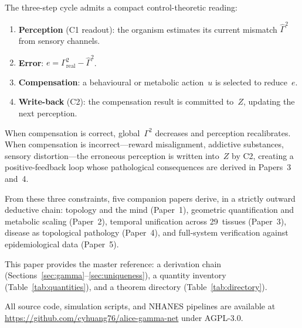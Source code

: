 \documentclass[aps,pre,twocolumn,superscriptaddress,floatfix]{revtex4-2}
\begin{document}
\begin{remark}
\label{rem:pec-loop}
The three-step cycle admits a compact control-theoretic
reading:
\begin{enumerate}
  \item \textbf{Perception} (C1 readout):
    the organism estimates its current mismatch
    $\hat\Gamma^2$ from sensory channels.
  \item \textbf{Error}:
    $e = \Gamma^2_{\text{real}}
    - \hat\Gamma^2$.
  \item \textbf{Compensation}:
    a behavioural or metabolic action~$u$ is selected
    to reduce~$e$.
  \item \textbf{Write-back} (C2):
    the compensation result is committed to~$Z$,
    updating the next perception.
\end{enumerate}
When compensation is correct, global~$\Gamma^2$
decreases and perception recalibrates.
When compensation is incorrect---reward misalignment,
addictive substances, sensory distortion---the
erroneous perception is written into~$Z$ by C2,
creating a positive-feedback loop whose
pathological consequences are derived in
Papers~3 and~4.
\end{remark}

From these three constraints, five companion papers
derive, in a strictly outward deductive chain:
topology and the mind (Paper~1),
geometric quantification and metabolic scaling (Paper~2),
temporal unification across 29~tissues (Paper~3),
disease as topological pathology (Paper~4),
and full-system verification against epidemiological
data (Paper~5).

This paper provides the master reference:
a derivation chain (Sections~\ref{sec:gamma}--\ref{sec:uniqueness}),
a quantity inventory (Table~\ref{tab:quantities}),
and a theorem directory (Table~\ref{tab:directory}).

All source code, simulation scripts, and NHANES pipelines
are available at
\url{https://github.com/cyhuang76/alice-gamma-net}
under AGPL-3.0.
\end{document}
